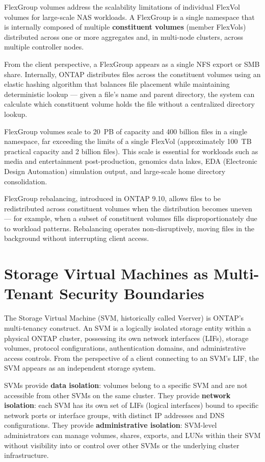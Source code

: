 FlexGroup volumes address the scalability limitations of individual FlexVol volumes for large-scale NAS workloads. A FlexGroup is a single namespace that is internally composed of multiple \textbf{constituent volumes} (member FlexVols) distributed across one or more aggregates and, in multi-node clusters, across multiple controller nodes.

From the client perspective, a FlexGroup appears as a single NFS export or SMB share. Internally, ONTAP distributes files across the constituent volumes using an elastic hashing algorithm that balances file placement while maintaining deterministic lookup --- given a file's name and parent directory, the system can calculate which constituent volume holds the file without a centralized directory lookup.

FlexGroup volumes scale to 20~PB of capacity and 400 billion files in a single namespace, far exceeding the limits of a single FlexVol (approximately 100~TB practical capacity and 2 billion files). This scale is essential for workloads such as media and entertainment post-production, genomics data lakes, EDA (Electronic Design Automation) simulation output, and large-scale home directory consolidation.

FlexGroup rebalancing, introduced in ONTAP 9.10, allows files to be redistributed across constituent volumes when the distribution becomes uneven --- for example, when a subset of constituent volumes fills disproportionately due to workload patterns. Rebalancing operates non-disruptively, moving files in the background without interrupting client access.

\section{Storage Virtual Machines as Multi-Tenant Security Boundaries}

The Storage Virtual Machine (SVM, historically called Vserver) is ONTAP's multi-tenancy construct. An SVM is a logically isolated storage entity within a physical ONTAP cluster, possessing its own network interfaces (LIFs), storage volumes, protocol configurations, authentication domains, and administrative access controls. From the perspective of a client connecting to an SVM's LIF, the SVM appears as an independent storage system.

SVMs provide \textbf{data isolation}: volumes belong to a specific SVM and are not accessible from other SVMs on the same cluster. They provide \textbf{network isolation}: each SVM has its own set of LIFs (logical interfaces) bound to specific network ports or interface groups, with distinct IP addresses and DNS configurations. They provide \textbf{administrative isolation}: SVM-level administrators can manage volumes, shares, exports, and LUNs within their SVM without visibility into or control over other SVMs or the underlying cluster infrastructure.

